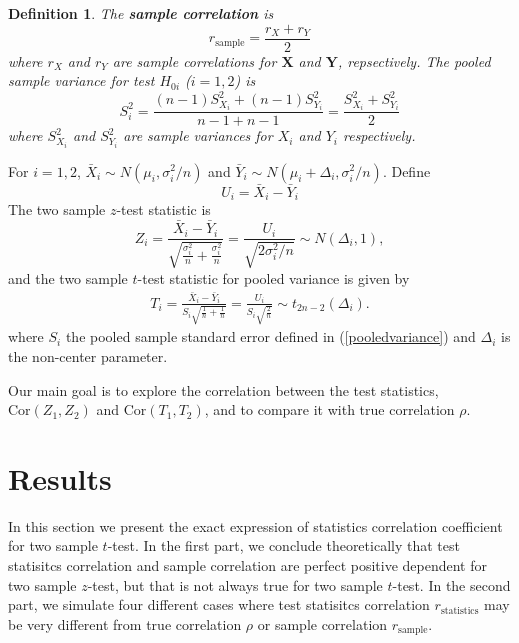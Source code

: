 \documentclass[11pt, a4paper]{article}
\newtheorem{definition}{Definition}     %
\begin{document}
\begin{definition}
	The \textbf{sample correlation} is 
	\begin{equation}\label{rhosample}
		r_{\text{sample}}  = \frac{r_X + r_Y}{2}
	\end{equation}
	where $r_X$  and $r_Y$ are sample correlations for $\bm X$ and $\bm Y$, repsectively.
		The pooled sample variance for test $H_{0i}$ ($i=1, 2$) is 
	\begin{equation}\label{pooledvariance}
		S_i^2 = \frac{(n-1)S_{X_i}^2 + (n-1)S_{Y_i}^2}{n-1 + n-1} = \frac{S_{X_i}^2 + S_{Y_i}^2}{2}
	\end{equation}
	where $S_{X_i}^2$ and $S_{Y_i}^2$ are sample variances for $X_i$ and $Y_i$ respectively.
\end{definition} 


For $i =1, 2$,  $\bar{X}_{i}\sim N(\mu_i, \sigma_i^2/n)$ and $\bar{Y}_{i}\sim N(\mu_i + \Delta_i, \sigma_i^2/n)$. Define
\begin{equation}\label{expreU}
U_i = \bar{X}_i - \bar{Y}_i
\end{equation}
The two sample $z$-test statistic is
\begin{equation}\label{zTest}
Z_i = \frac{\bar{X}_{i}-\bar{Y}_{i} }{\sqrt{\frac{\sigma^2_i}{n} + \frac{\sigma^2_i}{n}}} = \frac{U_i}{\sqrt{2\sigma_i^2/n}}\sim N(\Delta_i, 1) ,
\end{equation}
and the two sample $t$-test statistic for pooled variance is given by
\begin{align}\label{t-test}
T_i = \frac{\bar{X}_i - \bar{Y}_i}{S_i\sqrt{\frac{1}{n}+\frac{1}{n}}} = \frac{U_i}{S_i\sqrt{\frac{2}{n}}} \sim t_{2n-2}(\Delta_i). 
\end{align}
where $S_i$ the pooled sample standard error defined in (\ref{pooledvariance}) and $\Delta_i$ is the non-center parameter. 

Our main goal is to explore the correlation between the test statistics, $\text{Cor}({Z_1, Z_2})$ and $\text{Cor}({T_1, T_2})$, and to compare it with true correlation $\rho$. 



\section{Results}

 In this section we present the exact expression of statistics correlation coefficient for two sample $t$-test. In the first part, we conclude theoretically that test statisitcs correlation and sample correlation are perfect positive dependent for two sample $z$-test, but that is not always true for two sample $t$-test. In the second part, we simulate four different cases where test statisitcs correlation $r_{\text{statistics}}$ may be very different from true correlation $\rho$ or sample correlation $r_{\text{sample}}$. 
\end{document}
